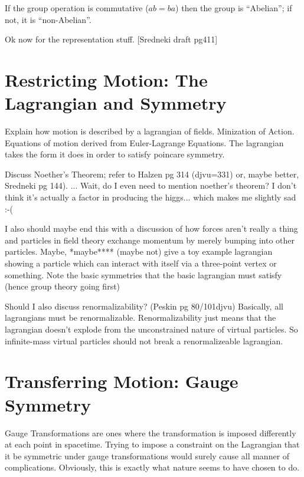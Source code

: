     If the group operation is commutative ($ab=ba$) then the group is ``Abelian''; if not, it is ``non-Abelian''.

    Ok now for the representation stuff. [Sredneki draft pg411]

    \cite{Cheng_book}

\section{Restricting Motion: The Lagrangian and Symmetry}

    Explain how motion is described by a lagrangian of fields. 
    Minization of Action.
    Equations of motion derived from Euler-Lagrange Equations.
    The lagrangian takes the form it does in order to satisfy poincare symmetry.

    Discuss Noether's Theorem; refer to Halzen pg 314 (djvu=331) or, maybe better, Sredneki pg 144).
        ... Wait, do I even need to mention noether's theorem?
        I don't think it's actually a factor in producing the higgs... which makes me slightly sad :-(

    I also should maybe end this with a discussion of how forces aren't really a thing
        and particles in field theory exchange momentum by merely bumping into other particles.
    Maybe, *maybe**** (maybe not) give a toy example lagrangian showing a particle which can interact with itself via a three-point vertex or something.
    Note the basic symmetries that the basic lagrangian must satisfy (hence group theory going first)
    
    Should I also discuss renormalizability? (Peskin pg 80/101djvu)
    Basically, all lagrangians must be renormalizable.
    Renormalizability just means that the lagrangian doesn't explode from the unconstrained nature of virtual particles.
    So infinite-mass virtual particles should not break a renormalizeable lagrangian.
    \cite{Halzen_book}


\section{Transferring Motion: Gauge Symmetry}
    Gauge Transformations are ones where the transformation is imposed differently at each point in spacetime.
    Trying to impose a constraint on the Lagrangian that it be symmetric under gauge transformations would surely cause all manner of complications.
    Obviously, this is exactly what nature seems to have chosen to do.

